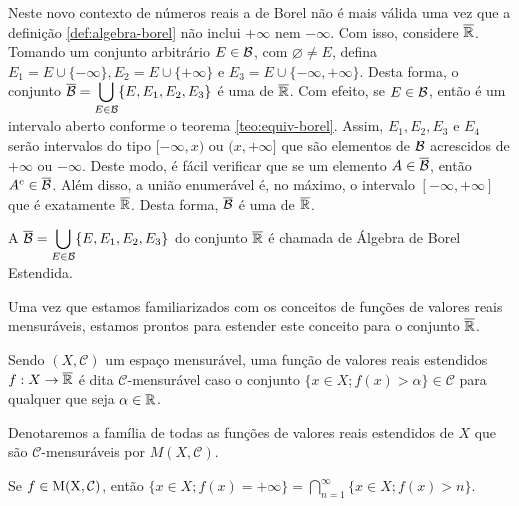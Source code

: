     Neste novo contexto de números reais a \sigal de Borel não é mais válida uma vez que a definição \ref{def:algebra-borel} não inclui $+\infty$ nem $-\infty$.
    Com isso, considere $\operatorname{\overline{\mathbb{R}}}$.
    Tomando um conjunto arbitrário $E \in \operatorname{\mathcal{B}}$, com $\varnothing \neq E$, defina $E_1 = E \cup \{-\infty\}, E_2 = E \cup \{+\infty\}$ e $E_3 = E \cup \{-\infty, +\infty\}$. 
    Desta forma, o conjunto $\overline{\operatorname{\mathcal{B}}} = \displaystyle \bigcup_{E \in \operatorname{\mathcal{B}}} \{E, E_1, E_2, E_3\}$ é uma \sigal de $\operatorname{\overline{\mathbb{R}}}$. Com efeito, se $E \in \operatorname{\mathcal{B}}$, então é um intervalo aberto conforme o teorema \ref{teo:equiv-borel}.
    Assim, $E_1, E_2, E_3$ e $E_4$ serão intervalos do tipo $[-\infty,x)$ ou $(x, +\infty]$ que são elementos de $\operatorname{\mathcal{B}}$ acrescidos de $+\infty$ ou $-\infty$. 
    Deste modo, é fácil verificar que se um elemento $A \in \operatorname{\overline{\operatorname{\mathcal{B}}}}$, então $A^c \in \operatorname{\overline{\operatorname{\mathcal{B}}}}$.
    Além disso, a união enumerável é, no máximo, o intervalo $[-\infty,+\infty]$ que é exatamente $\operatorname{\overline{\mathbb{R}}}$.
    Desta forma, $\operatorname{\overline{\operatorname{\mathcal{B}}}}$ é uma \sigal de $\operatorname{\overline{\mathbb{R}}}$.

    \begin{definition}
    \label{def:algebra-borel-estendida}
        A \sigal $\overline{\operatorname{\mathcal{B}}} = \displaystyle \bigcup_{E \in \operatorname{\mathcal{B}}} \{E, E_1, E_2, E_3\}$ do conjunto $\operatorname{\overline{\mathbb{R}}}$ é chamada de Álgebra de Borel Estendida. 
    \end{definition}

    Uma vez que estamos familiarizados com os conceitos de funções de valores reais mensuráveis, estamos prontos para estender este conceito para o conjunto $\operatorname{\overline{\mathbb{R}}}$.

    \begin{definition}
    \label{def:familia-funcoes-mensuraveis}
        Sendo $(X, \mathcal{C})$ um espaço mensurável, uma função de valores reais estendidos $f: X \to \operatorname{\overline{\mathbb{R}}}$ é dita $\mathcal{C}$-mensurável caso o conjunto
        $\{x \in X; f(x) > \alpha\} \in \mathcal{C}$ para qualquer que seja $\alpha \in \mathbb{R}$. 
    \end{definition}

	Denotaremos a família de todas as funções de valores reais estendidos de $X$ que são $\mathcal{C}$-mensuráveis por $M(X, \mathcal{C})$.
    \begin{proposition}
    \label{prop:identidade-intersecao-mais-infinito}
        Se $f \in \operatorname{M(X, \mathcal{C} )}$, então $\{x \in X; f(x) = +\infty\} = \displaystyle \bigcap_{n = 1}^\infty \{x \in X; f(x) > n\}$.
    \end{proposition}

